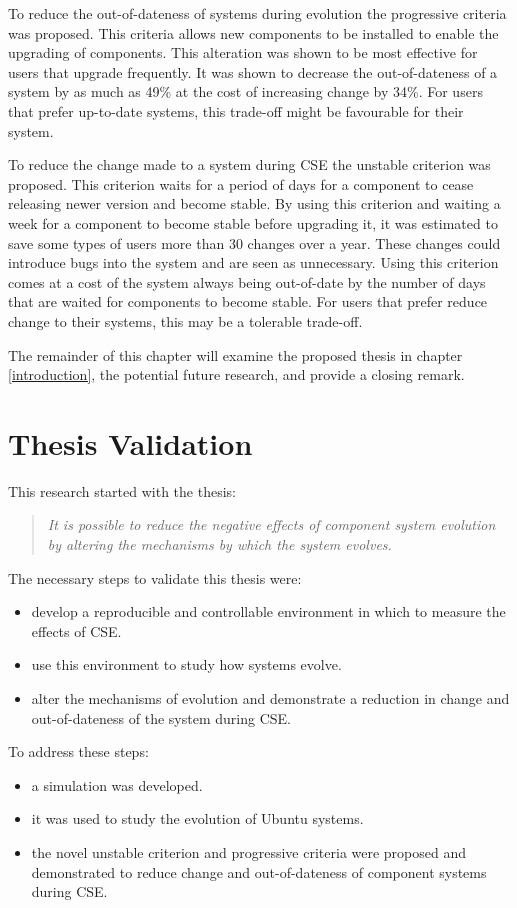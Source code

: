 To reduce the out-of-dateness of systems during evolution the progressive criteria was proposed.
This criteria allows new components to be installed to enable the upgrading of components.
This alteration was shown to be most effective for users that upgrade frequently.
It was shown to decrease the out-of-dateness of a system by as much as 49\% at the cost of increasing change by 34\%.
For users that prefer up-to-date systems, this trade-off might be favourable for their system.

To reduce the change made to a system during CSE the unstable criterion was proposed.
This criterion waits for a period of days for a component to cease releasing newer version and become stable.
By using this criterion and waiting a week for a component to become stable before upgrading it, it was estimated to save some types of users more than 30 changes over a year.
These changes could introduce bugs into the system and are seen as unnecessary. 
Using this criterion comes at a cost of the system always being out-of-date by the number of days that are waited for components to become stable.
For users that prefer reduce change to their systems, this may be a tolerable trade-off.

The remainder of this chapter will examine the proposed thesis in chapter \ref{introduction},
the potential future research,
and provide a closing remark.
\section{Thesis Validation}
This research started with the thesis:
\begin{quote}
\textit{It is possible to reduce the negative effects of component system evolution by altering the mechanisms by which the system evolves.} 
\end{quote}
The necessary steps to validate this thesis were:
\begin{itemize}
  \item develop a reproducible and controllable environment in which to measure the effects of CSE.
  \item use this environment to study how systems evolve.
  \item alter the mechanisms of evolution and demonstrate a reduction in change and out-of-dateness of the system during CSE.
\end{itemize}

To address these steps:
\begin{itemize}
  \item a simulation was developed.
  \item it was used to study the evolution of Ubuntu systems.
  \item the novel unstable criterion and progressive criteria  were proposed and demonstrated to reduce change and out-of-dateness of component systems during CSE.
\end{itemize}  


